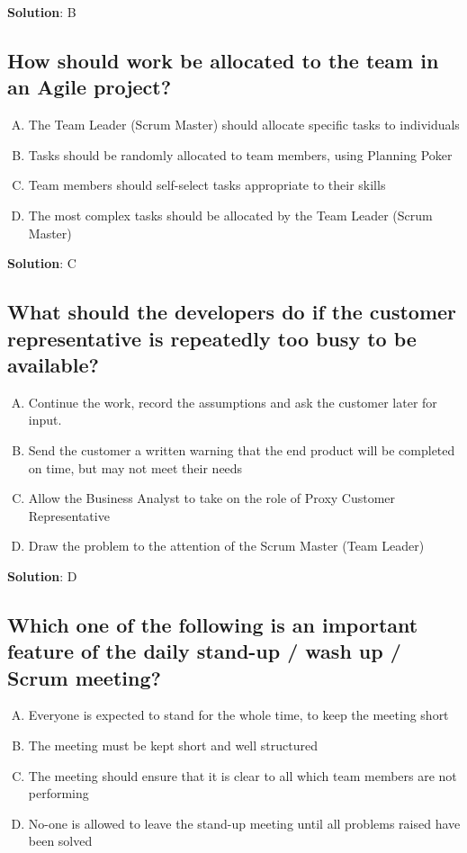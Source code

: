 \textbf{Solution}: B


\subsection{How should work be allocated to the team in an Agile project?}
\begin{enumerate}[A)]
  \item The Team Leader (Scrum Master) should allocate specific tasks to individuals
  \item Tasks should be randomly allocated to team members, using Planning Poker
  \item Team members should self-select tasks appropriate to their skills
  \item The most complex tasks should be allocated by the Team Leader (Scrum Master)
\end{enumerate}

\textbf{Solution}: C


\subsection{What should the developers do if the customer representative is repeatedly too busy to be available?}
\begin{enumerate}[A)]
  \item Continue the work, record the assumptions and ask the customer later for input.
  \item Send the customer a written warning that the end product will be completed on time, but may not meet their needs
  \item Allow the Business Analyst to take on the role of Proxy Customer Representative
  \item Draw the problem to the attention of the Scrum Master (Team Leader)
\end{enumerate}

\textbf{Solution}: D


\subsection{Which one of the following is an important feature of the daily stand-up / wash up / Scrum meeting?}
\begin{enumerate}[A)]
  \item Everyone is expected to stand for the whole time, to keep the meeting short
  \item The meeting must be kept short and well structured
  \item The meeting should ensure that it is clear to all which team members are not performing
  \item No-one is allowed to leave the stand-up meeting until all problems raised have been solved
\end{enumerate}

